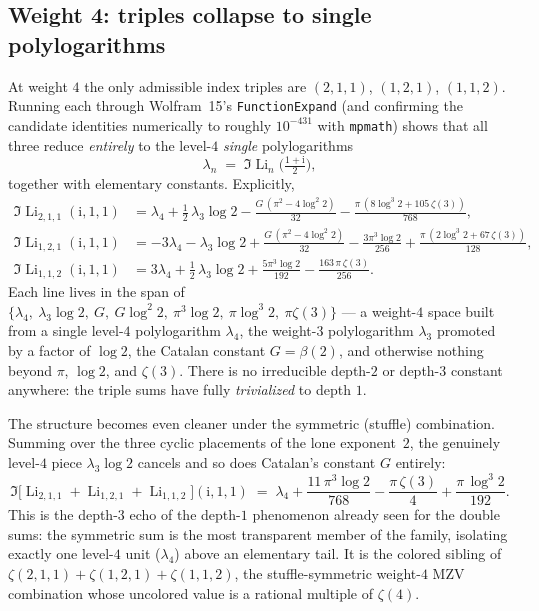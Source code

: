 \documentclass[11pt]{article}
\DeclareMathOperator{\Li}{Li}
\newcommand{\iu}{\mathrm{i}}
\theoremstyle{plain}
\theoremstyle{remark}
\begin{document}
\subsection*{Weight 4: triples collapse to single polylogarithms}

At weight $4$ the only admissible index triples are $(2,1,1)$, $(1,2,1)$, $(1,1,2)$. Running each through Wolfram~15's \texttt{FunctionExpand} (and confirming the candidate identities numerically to roughly $10^{-431}$ with \texttt{mpmath}) shows that all three reduce \emph{entirely} to the level-$4$ \emph{single} polylogarithms
\[
  \lambda_n \;=\; \Im\Li_n\!\Big(\tfrac{1+\iu}{2}\Big),
\]
together with elementary constants. Explicitly,
\begin{align}
  \Im\Li_{2,1,1}(\iu,1,1)
    &= \lambda_4 + \tfrac12\,\lambda_3\log 2
       - \frac{G\,(\pi^2-4\log^2 2)}{32}
       - \frac{\pi\,(8\log^3 2 + 105\,\zeta(3))}{768},\\[2pt]
  \Im\Li_{1,2,1}(\iu,1,1)
    &= -3\lambda_4 - \lambda_3\log 2
       + \frac{G\,(\pi^2-4\log^2 2)}{32}
       - \frac{3\pi^3\log 2}{256}
       + \frac{\pi\,(2\log^3 2 + 67\,\zeta(3))}{128},\\[2pt]
  \Im\Li_{1,1,2}(\iu,1,1)
    &= 3\lambda_4 + \tfrac12\,\lambda_3\log 2
       + \frac{5\pi^3\log 2}{192}
       - \frac{163\,\pi\,\zeta(3)}{256}.
\end{align}
Each line lives in the span of $\{\lambda_4,\ \lambda_3\log 2,\ G,\ G\log^2 2,\ \pi^3\log 2,\ \pi\log^3 2,\ \pi\zeta(3)\}$ --- a weight-$4$ space built from a single level-$4$ polylogarithm $\lambda_4$, the weight-$3$ polylogarithm $\lambda_3$ promoted by a factor of $\log 2$, the Catalan constant $G=\beta(2)$, and otherwise nothing beyond $\pi$, $\log 2$, and $\zeta(3)$. There is no irreducible depth-$2$ or depth-$3$ constant anywhere: the triple sums have fully \emph{trivialized} to depth $1$.

The structure becomes even cleaner under the symmetric (stuffle) combination. Summing over the three cyclic placements of the lone exponent~$2$, the genuinely level-$4$ piece $\lambda_3\log 2$ cancels and so does Catalan's constant $G$ entirely:
\[
  \Im\big[\Li_{2,1,1}+\Li_{1,2,1}+\Li_{1,1,2}\big](\iu,1,1)
   \;=\; \lambda_4 + \frac{11\,\pi^3\log 2}{768} - \frac{\pi\,\zeta(3)}{4} + \frac{\pi\,\log^3 2}{192}.
\]
This is the depth-$3$ echo of the depth-$1$ phenomenon already seen for the double sums: the symmetric sum is the most transparent member of the family, isolating exactly one level-$4$ unit ($\lambda_4$) above an elementary tail. It is the colored sibling of $\zeta(2,1,1)+\zeta(1,2,1)+\zeta(1,1,2)$, the stuffle-symmetric weight-$4$ MZV combination whose uncolored value is a rational multiple of $\zeta(4)$.
\end{document}

